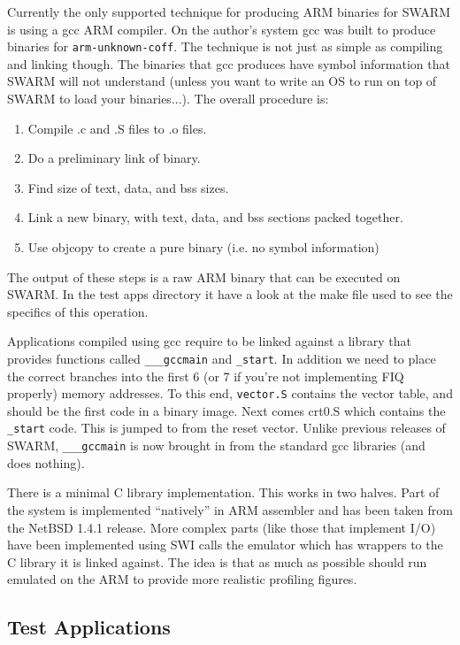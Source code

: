 \documentclass[10pt,a4paper]{article}
\begin{document}
Currently the only supported technique for producing ARM binaries for
SWARM is using a gcc ARM compiler. On the author's system gcc was
built to produce binaries for \texttt{arm-unknown-coff}. The technique
is not just as simple as compiling and linking though. The binaries
that gcc produces have symbol information that SWARM will not
understand (unless you want to write an OS to run on top of SWARM to
load your binaries...). The overall procedure is:

\begin{enumerate}
\item Compile .c and .S files to .o files.
\item Do a preliminary link of binary. 
\item Find size of text, data, and bss sizes.
\item Link a new binary, with text, data, and bss sections packed
together.
\item Use objcopy to create a pure binary (i.e. no symbol information)
\end{enumerate}

The output of these steps is a raw ARM binary that can be executed on
SWARM. In the test apps directory it have a look at the make file used
to see the specifics of this operation.

Applications compiled using gcc require to be linked against a library
that provides functions called \texttt{\_\_\_gccmain} and
\texttt{\_start}. In addition we need to place the correct branches
into the first 6 (or 7 if you're not implementing FIQ properly) memory
addresses. To this end, \texttt{vector.S} contains the vector table,
and should be the first code in a binary image. Next comes crt0.S
which contains the \texttt{\_start} code. This is jumped to from the
reset vector. Unlike previous releases of SWARM,
\texttt{\_\_\_gccmain} is now brought in from the standard gcc
libraries (and does nothing).

There is a minimal C library implementation. This works in two
halves. Part of the system is implemented ``natively'' in ARM
assembler and has been taken from the NetBSD 1.4.1 release. More
complex parts (like those that implement I/O) have been implemented
using SWI
calls the emulator which has wrappers to the C library it is
linked against. The idea is that as much as possible should run
emulated on the ARM to provide more realistic profiling figures.


\subsection{Test Applications} %
\label{sec:testapps}           %
\end{document}
